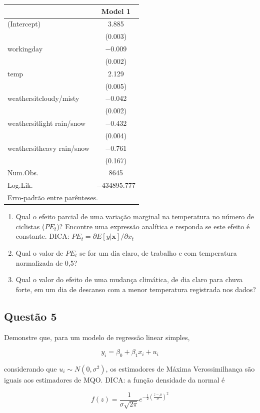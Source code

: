 \documentclass[
]{article}
\begin{document}
\begin{table}
\centering
\begin{tabular}[t]{lc}
\toprule
  & Model 1\\
\midrule
(Intercept) & \num{3.885}\\
 & (\num{0.003})\\
workingday & \num{-0.009}\\
 & \vphantom{1} (\num{0.002})\\
temp & \num{2.129}\\
 & (\num{0.005})\\
weathersitcloudy/misty & \num{-0.042}\\
 & (\num{0.002})\\
weathersitlight rain/snow & \num{-0.432}\\
 & (\num{0.004})\\
weathersitheavy rain/snow & \num{-0.761}\\
 & (\num{0.167})\\
\midrule
Num.Obs. & \num{8645}\\
Log.Lik. & \num{-434895.777}\\
\bottomrule
\multicolumn{2}{l}{\rule{0pt}{1em}Erro-padrão entre parênteses.}\\
\end{tabular}
\end{table}

\begin{enumerate}
\def\labelenumi{\alph{enumi})}
\setcounter{enumi}{2}
\item
  Qual o efeito parcial de uma variação marginal na temperatura no
  número de ciclistas (\(PE_t\))? Encontre uma expressão analítica e
  responda se este efeito é constante. DICA:
  \(PE_t=\partial E[y|\symbf{x}]/\partial x_t\)
\item
  Qual o valor de \(PE_t\) se for um dia claro, de trabalho e com
  temperatura normalizada de 0,5?
\item
  Qual o valor do efeito de uma mudança climática, de dia claro para
  chuva forte, em um dia de descanso com a menor temperatura registrada
  nos dados?
\end{enumerate}

\hypertarget{questuxe3o-5}{%
\subsection{Questão 5}\label{questuxe3o-5}}

Demonstre que, para um modelo de regressão linear simples,

\[y_i=\beta_0+\beta_1 x_i+u_i\]

considerando que \(u_i\sim N(0, \sigma^2)\), os estimadores de Máxima
Verossimilhança são iguais aos estimadores de MQO. DICA: a função
densidade da normal é

\[
{\displaystyle f(z)={\frac {1}{\sigma {\sqrt {2\pi }}}}e^{-{\frac {1}{2}}\left({\frac {z-\mu }{\sigma }}\right)^{2}}}
\]
\end{document}
